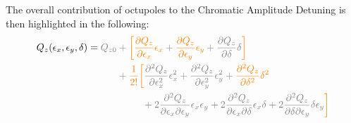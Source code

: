 The overall contribution of octupoles to the Chromatic Amplitude Detuning is then highlighted in
the following:
\begin{equation}
\begin{aligned}
Q_z(\epsilon_x, \epsilon_y, \delta) = \color{gray}Q_{z0} &\color{gray}+
                                                \textcolor{orange}{\biggl[}
                                                   \textcolor{orange}{\frac{\partial Q_z}{\partial \epsilon_x} \epsilon_x}
                                                 + \textcolor{orange}{\frac{\partial Q_z}{\partial \epsilon_y} \epsilon_y}
                                                 + \frac{\partial Q_z}{\partial \delta} \delta
                                                \textcolor{orange}{\biggr]} \\
                                             &\color{gray}
                                             + \textcolor{orange}{\frac{1}{2!} \biggl[}
                                                   \frac{\partial^2Q_z}{\partial \epsilon_x^2}\epsilon_x^2 
                                                 + \frac{\partial^2Q_z}{\partial \epsilon_y^2}\epsilon_y^2
                                                 + \textcolor{orange}{\frac{\partial^2 Q_z}{\partial \delta^2} \delta^2}  \\
                                             &\;\begin{aligned}
                                             \phantom{+ \frac{1}{2!} \biggl[}
                                               & \color{gray}
                                               + 2 \frac{\partial^2Q_z}{\partial \epsilon_x \partial \epsilon_y}\epsilon_x \epsilon_y
                                                  + 2 \frac{\partial^2Q_z}{\partial \epsilon_x \partial \delta}\epsilon_x \delta
                                                  + 2 \frac{\partial^2Q_z}{\partial \delta \partial \epsilon_y} \delta \epsilon_y
                                             \textcolor{orange}{\biggr]} \\
                                             \end{aligned} 
\end{aligned}
\end{equation}


\subsection{}
\label{decapole-2}

